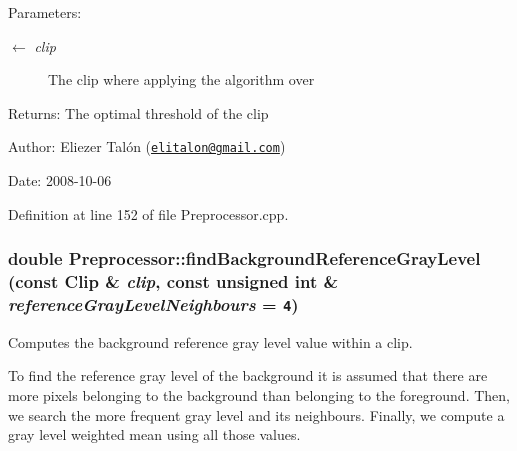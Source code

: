 \begin{Desc}
\item[Parameters:]
\begin{description}
\item[\mbox{$\leftarrow$} {\em clip}]The clip where applying the algorithm over\end{description}
\end{Desc}
\begin{Desc}
\item[Returns:]The optimal threshold of the clip\end{Desc}
\begin{Desc}
\item[Author:]Eliezer Talón (\href{mailto:elitalon@gmail.com}{\tt elitalon@gmail.com}) \end{Desc}
\begin{Desc}
\item[Date:]2008-10-06 \end{Desc}


Definition at line 152 of file Preprocessor.cpp.\hypertarget{class_preprocessor_1cd0543e1e41124a9dd26c99036ac62d}{
\subsubsection[findBackgroundReferenceGrayLevel]{\setlength{\rightskip}{0pt plus 5cm}double Preprocessor::findBackgroundReferenceGrayLevel (const {\bf Clip} \& {\em clip}, \/  const unsigned int \& {\em referenceGrayLevelNeighbours} = {\tt 4})}}
\label{class_preprocessor_1cd0543e1e41124a9dd26c99036ac62d}


Computes the background reference gray level value within a clip. 

To find the reference gray level of the background it is assumed that there are more pixels belonging to the background than belonging to the foreground. Then, we search the more frequent gray level and its neighbours. Finally, we compute a gray level weighted mean using all those values.

